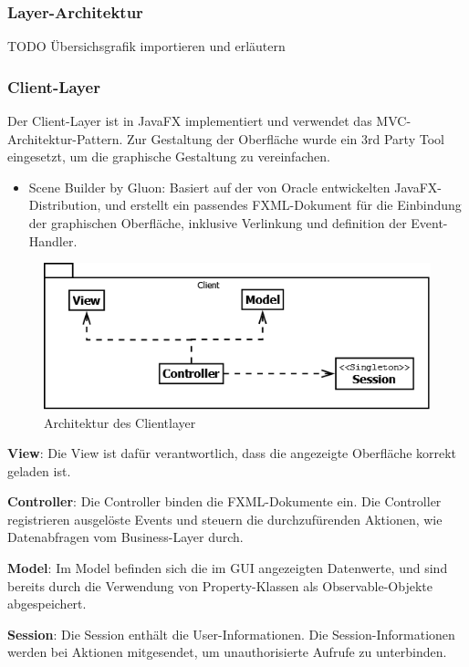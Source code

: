 \subsubsection{Layer-Architektur}
TODO Übersichsgrafik importieren und erläutern

\subsubsection{Client-Layer}
Der Client-Layer ist in JavaFX implementiert und verwendet das MVC-Architektur-Pattern. Zur Gestaltung der Oberfläche wurde ein 3rd Party Tool eingesetzt, um die graphische Gestaltung zu vereinfachen.
\begin{itemize}
\item Scene Builder by Gluon: Basiert auf der von Oracle entwickelten JavaFX-Distribution, und erstellt ein passendes FXML-Dokument für die Einbindung der graphischen Oberfläche, inklusive Verlinkung und definition der Event-Handler. 
\end{itemize}
\begin{figure}[H]
	\includegraphics[width=1.0\linewidth]{Images/ClientLayer-Architektur}
	\caption{Architektur des Clientlayer}
	\label{fig:clientlayer-architektur}
\end{figure}

\textbf{View}: Die View ist dafür verantwortlich, dass die angezeigte Oberfläche korrekt geladen ist.

\textbf{Controller}: Die Controller binden die FXML-Dokumente ein. Die Controller registrieren ausgelöste Events und steuern die durchzufürenden Aktionen, wie Datenabfragen vom Business-Layer durch.

\textbf{Model}: Im Model befinden sich die im GUI angezeigten Datenwerte, und sind bereits durch die Verwendung von Property-Klassen als Observable-Objekte abgespeichert.

\textbf{Session}: Die Session enthält die User-Informationen. Die Session-Informationen werden bei Aktionen mitgesendet, um unauthorisierte Aufrufe zu unterbinden.

